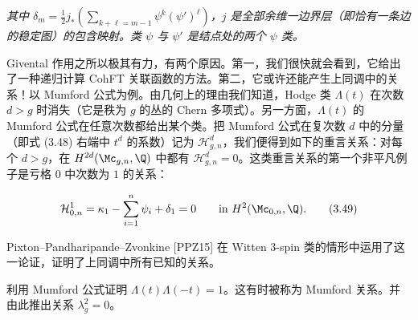 
\emph{其中 $\delta_m=\frac12 j_*\left(\sum_{k+\ell=m-1}\psi^k(\psi')^\ell\right)$，$j$ 是全部余维一边界层（即恰有一条边的稳定图）的包含映射。类 $\psi$ 与 $\psi'$ 是结点处的两个 $\psi$ 类。}

Givental 作用之所以极其有力，有两个原因。第一，我们很快就会看到，它给出了一种递归计算 CohFT 关联函数的方法。第二，它或许还能产生上同调中的关系！以 Mumford 公式为例。由几何上的理由我们知道，Hodge 类 $\Lambda(t)$ 在次数 $d>g$ 时消失（它是秩为 $g$ 的丛的 Chern 多项式）。另一方面，$\Lambda(t)$ 的 Mumford 公式在任意次数都给出某个类。把 Mumford 公式在复次数 $d$ 中的分量（即式 (3.48) 右端中 $t^d$ 的系数）记为 $\mathcal H^d_{g,n}$，我们便得到如下的重言关系：对每个 $d>g$，在 $H^{2d}(\Mc_{g,n},\Q)$ 中都有 $\mathcal H^d_{g,n}=0$。这类重言关系的第一个非平凡例子是亏格 $0$ 中次数为 $1$ 的关系：


\begin{equation}
  \mathcal H^1_{0,n}=\kappa_1-\sum_{i=1}^{n}\psi_i+\delta_1=0 \qquad \text{in } H^2(\Mc_{0,n},\Q).
  \tag{3.49}
\end{equation}


Pixton–Pandharipande–Zvonkine [PPZ15] 在 Witten 3-spin 类的情形中运用了这一论证，证明了上同调中所有已知的关系。

\begin{exercise}[3.3]
利用 Mumford 公式证明 $\Lambda(t)\Lambda(-t)=1$。这有时被称为 Mumford 关系。并由此推出关系 $\lambda_g^2=0$。
\end{exercise}


